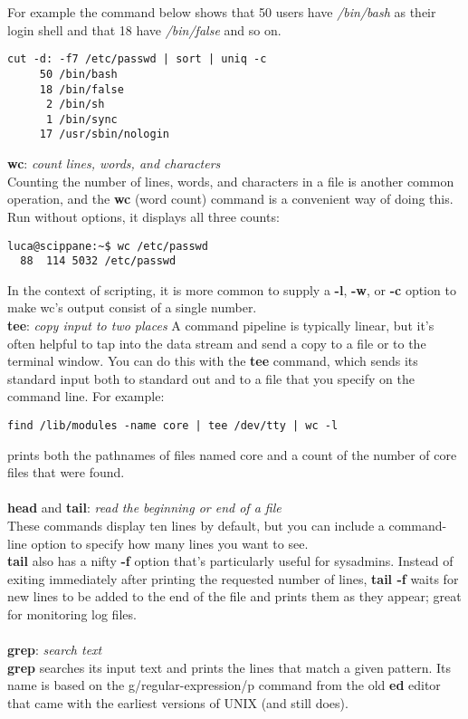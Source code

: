\documentclass[10pt,letterpaper]{book}
\begin{document}
For example the command below shows that 50 users have \textit{/bin/bash} as their login shell and that 18 have \textit{/bin/false} and so on.
\begin{lstlisting}
cut -d: -f7 /etc/passwd | sort | uniq -c
     50 /bin/bash
     18 /bin/false
      2 /bin/sh
      1 /bin/sync
     17 /usr/sbin/nologin
\end{lstlisting}
\textbf{wc}: \textit{count lines, words, and characters}\\
Counting the number of lines, words, and characters in a file is another common
operation, and the \textbf{wc} (word count) command is a convenient way of doing this. Run without options, it displays all three counts:
\begin{lstlisting}
luca@scippane:~$ wc /etc/passwd
  88  114 5032 /etc/passwd
\end{lstlisting}
In the context of scripting, it is more common to supply a \textbf{-l}, \textbf{-w}, or \textbf{-c} option to make wc's output consist of a single number.
\\
\textbf{tee}: \textit{copy input to two places}
A command pipeline is typically linear, but it's often helpful to tap into the data stream and send a copy to a file or to the terminal window. You can do this with the \textbf{tee} command, which sends its standard input both to standard out and to a file that you specify on the command line. For example:
\begin{lstlisting}
find /lib/modules -name core | tee /dev/tty | wc -l
\end{lstlisting}
prints both the pathnames of files named core and a count of the number of core
files that were found.\\
\\
\textbf{head} and \textbf{tail}: \textit{read the beginning or end of a file}
\\
These commands display ten lines by default, but you can include a command-line option to specify how many lines you want to see.\\
\textbf{tail} also has a nifty \textbf{-f} option that's particularly useful for sysadmins. Instead of exiting immediately after printing the requested number of lines, \textbf{tail -f} waits for new lines to be added to the end of the file and prints them as they appear; great for monitoring log files.\\
\\
\textbf{grep}: \textit{search text}\\
\textbf{grep} searches its input text and prints the lines that match a given pattern. Its name is based on the g/regular-expression/p command from the old \textbf{ed} editor that came with the earliest versions of UNIX (and still does).\\
\end{document}
